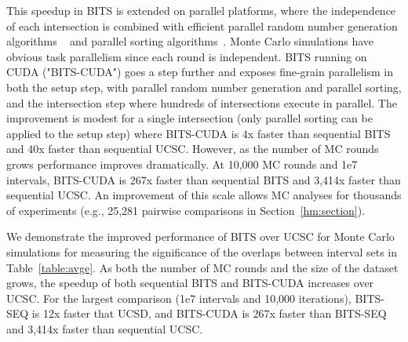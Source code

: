 \documentclass{bioinfo}
\begin{document}
This speedup in BITS is extended on parallel platforms, where the independence
of each intersection is combined with efficient parallel random number
generation algorithms ~\citep{tzeng2008} and parallel sorting
algorithms~\citep{merrill2011,satish2009}.  Monte Carlo simulations have obvious
task parallelism since each round is independent.  BITS running on CUDA 
("BITS-CUDA") goes a step further and exposes fine-grain parallelism in both the 
setup step, with
parallel random number generation and parallel sorting, and the intersection
step where hundreds of intersections execute in parallel.  The improvement is
modest for a single intersection (only parallel sorting can be applied to the
setup step) where BITS-CUDA is 4x faster than sequential BITS and 40x faster
than sequential UCSC.  However, as the number of MC rounds grows performance
improves dramatically.  At 10,000 MC rounds and 1e7 intervals, BITS-CUDA is 267x
faster than sequential BITS and 3,414x faster than sequential UCSC.  An
improvement of this scale allows MC analyses for thousands of experiments 
(e.g., 25,281 pairwise comparisons in Section~\ref{hm:section}).

We demonstrate the improved performance of BITS over UCSC for Monte Carlo
simulations for measuring the significance of the overlaps between interval sets
in Table~\ref{table:avge}.  As both the number of MC rounds and the size of
the dataset grows, the speedup of both sequential BITS and BITS-CUDA increases
over UCSC.  For the largest comparison (1e7 intervals and 10,000 iterations),
BITS-SEQ is 12x faster that UCSD, and BITS-CUDA is 267x
faster than BITS-SEQ and 3,414x faster than sequential UCSC.

\end{document}
